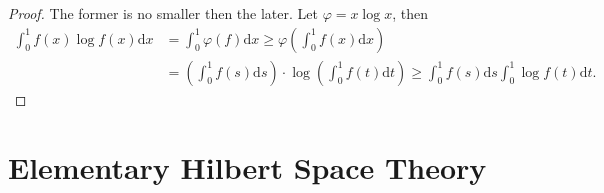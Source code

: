 \begin{proof}
The former is no smaller then the later. Let $\varphi=x\log x$, then 
$$
\begin{aligned}
\int_0^1{f\left( x \right) \log f\left( x \right) \mathrm{d}x}&=\int_0^1{\varphi \left( f \right) \mathrm{d}x}\ge \varphi \left( \int_0^1{f\left( x \right) \mathrm{d}x} \right) 
\\
&=\left( \int_0^1{f\left( s \right) \mathrm{d}s} \right) \cdot \log \left( \int_0^1{f\left( t \right) \mathrm{d}t} \right) \ge \int_0^1{f\left( s \right) \mathrm{d}s}\int_0^1{\log f\left( t \right) \mathrm{d}t}.
\end{aligned}
$$
\end{proof}
\newpage
\section{Elementary Hilbert Space Theory}
